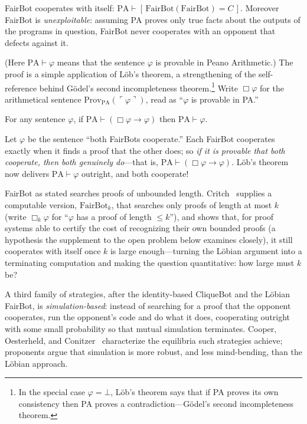 \begin{theorem*}
FairBot cooperates with itself: $\mathrm{PA} \vdash [\,\mathrm{FairBot}(\mathrm{FairBot}) = C\,]$. Moreover FairBot is \emph{unexploitable}: assuming PA proves only true facts about the outputs of the programs in question, FairBot never cooperates with an opponent that defects against it.
\end{theorem*}

(Here $\mathrm{PA}\vdash\varphi$ means that the sentence $\varphi$ is provable in Peano Arithmetic.) The proof is a simple application of L\"ob's theorem, a strengthening of the self-reference behind G\"odel's second incompleteness theorem.\footnote{In the special case $\varphi=\bot$, L\"ob's theorem says that if PA proves its own consistency then PA proves a contradiction---G\"odel's second incompleteness theorem.} Write $\Box\varphi$ for the arithmetical sentence $\mathrm{Prov}_{\mathrm{PA}}(\ulcorner\varphi\urcorner)$, read as ``$\varphi$ is provable in PA.''

\begin{theorem*}
For any sentence $\varphi$, if $\mathrm{PA} \vdash (\Box \varphi \to \varphi)$ then $\mathrm{PA} \vdash \varphi$.
\end{theorem*}

Let $\varphi$ be the sentence ``both FairBots cooperate.'' Each FairBot cooperates exactly when it finds a proof that the other does; so \emph{if it is provable that both cooperate, then both genuinely do}---that is, $\mathrm{PA} \vdash (\Box\varphi \to \varphi)$. L\"ob's theorem now delivers $\mathrm{PA} \vdash \varphi$ outright, and both cooperate!

FairBot as stated searches proofs of unbounded length. Critch~\cite{critch2016} supplies a computable version, $\mathrm{FairBot}_k$, that searches only proofs of length at most $k$ (write $\Box_k\varphi$ for ``$\varphi$ has a proof of length $\le k$''), and shows that, for proof systems able to certify the cost of recognizing their own bounded proofs (a hypothesis the supplement to the open problem below examines closely), it still cooperates with itself once $k$ is large enough---turning the L\"obian argument into a terminating computation and making the question quantitative: how large must $k$ be?

A third family of strategies, after the identity-based CliqueBot and the L\"obian FairBot, is \emph{simulation-based}: instead of searching for a proof that the opponent cooperates, run the opponent's code and do what it does, cooperating outright with some small probability so that mutual simulation terminates. Cooper, Oesterheld, and Conitzer~\cite{cooper2025} characterize the equilibria such strategies achieve; proponents argue that simulation is more robust, and less mind-bending, than the L\"obian approach.

